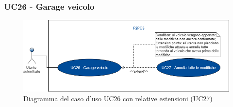 \subsubsection{UC26 - Garage veicolo}
\begin{figure}[h]
	\includegraphics[width=13cm]{res/images/UC26Garage.png}
	\centering
	\caption{Diagramma del caso d'uso UC26 con relative estensioni (UC27)}
\end{figure}
